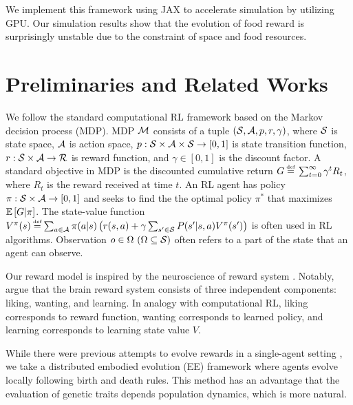 We implement this framework using JAX\citep{jax2018git} to accelerate simulation by utilizing GPU. Our simulation results show that the evolution of food reward is surprisingly unstable due to the constraint of space and food resources.

\section{Preliminaries and Related Works}\label{sec:related}
We follow the standard computational RL framework \citep{suttonReinforcementLearningIntroduction2018} based on the Markov decision process (MDP). MDP $\mathcal{M}{}$ consists of a tuple $(\mathcal{S}{}, \mathcal{A}{}, p, r, \gamma)$, where $\mathcal{S}{}$ is state space, $\mathcal{A}{}$ is action space, $p: \mathcal{S}\times\mathcal{A}\times \mathcal{S} \rightarrow [0, 1]$ is state transition function, $r: \mathcal{S}\times\mathcal{A} \rightarrow \mathcal{R}$ is reward function, and $\gamma \in [0, 1]$ is the discount factor. A standard objective in MDP is the discounted cumulative return $G \defequal{} \sum_{t=0}^{\infty}\gamma^t R_{t}$, where $R_t$ is the reward received at time $t$. An RL agent has policy $\pi: \mathcal{S} \times \mathcal{A} \rightarrow [0, 1]$ and seeks to find the the optimal policy $\pi^{*}$ that maximizes $\mathbb{E} \left[G|\pi\right]$. The state-value function $V^\pi(s) \defequal \sum_{a \in \A} \pi(a|s) \left( r(s, a) + \gamma \sum_{s' \in \X} P(s'|s, a) V^\pi(s') \right)$ is often used in RL algorithms. Observation $o \in \Omega~(\Omega \subseteq \mathcal{S})$ often refers to a part of the state that an agent can observe.

Our reward model is inspired by the neuroscience of reward system \citep{schultzNeuronalRewardDecision2015, berridgePleasureSystemsBrain2015}. Notably, \citet{berridgeDissectingComponentsReward2009} argue that the brain reward system consists of three independent components: liking, wanting, and learning. In analogy with computational RL, liking corresponds to reward function, wanting corresponds to learned policy, and learning corresponds to learning state value $V$. %

While 
there were previous attempts to evolve rewards in a single-agent setting \citep{singhWhereRewardsCome2009,niekumEvolutionRewardFunctions2011,zhengWhatCanLearned2020},
we take a distributed embodied evolution (EE) framework \citep{watsonEmbodiedEvolutionDistributing2002,bredecheEmbodiedEvolutionCollective2018}
where agents evolve locally following birth and death rules. This method has an advantage that the evaluation of genetic traits depends population dynamics, which is more natural.

